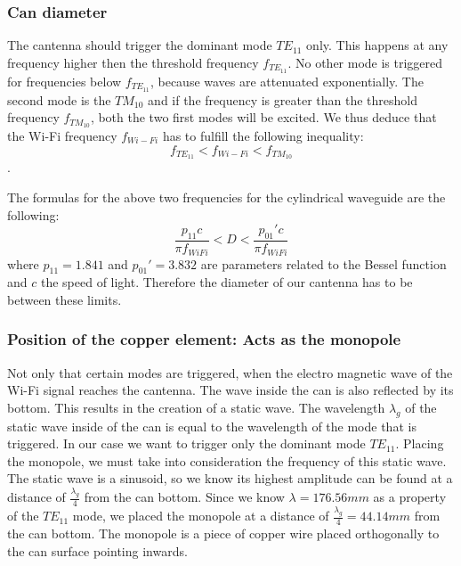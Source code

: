 \documentclass[12pt,a4paper]{article}
\begin{document}
		\subsubsection{Can diameter}
			The cantenna should trigger the dominant mode $TE_{11}$ only. This happens at any frequency higher then the threshold frequency $f_{TE_{11}}$. No other mode is triggered for frequencies below $f_{TE_{11}}$, because waves are attenuated exponentially.
			The second mode is the $TM_{10}$ and if the frequency is greater than the threshold frequency $f_{TM_{10}}$, both the two first modes will be excited.
			We thus deduce that the Wi-Fi frequency $f_{Wi-Fi}$ has to fulfill the following inequality:
			\begin{equation}
				f_{TE_{11}} < f_{Wi-Fi} < f_{TM_{10}}
			\end{equation}.
			
			The formulas for the above two frequencies for the cylindrical waveguide are the following\cite{waveguide}:
			\begin{equation}
				\frac{p_{11} c}{\pi f_{WiFi}} < D < \frac{p_{01}' c}{\pi f_{WiFi}}
			\end{equation}
			where $p_{11} = 1.841$ and $p_{01}'= 3.832$ are parameters related to the Bessel function and $c$ the speed of light.
			Therefore the diameter of our cantenna has to be between these limits. 
			
		\subsubsection{Position of the copper element: Acts as the monopole} \label{mono:pos}
			Not only that certain modes are triggered, when the electro magnetic wave of the Wi-Fi signal reaches the cantenna. The wave inside the can is also reflected by its bottom. This results in the creation of a static wave.
			The wavelength $\lambda_g$ of the static wave inside of the can is equal to the wavelength of the mode that is triggered. In our case we want to trigger only the dominant mode $TE_{11}$.
			Placing the monopole, we must take into consideration the frequency of this static wave.
			The static wave is a sinusoid, so we know its highest amplitude can be found at a distance of $\frac{\lambda_g}{4}$ from the can bottom.
			Since we know $\lambda = 176.56 mm$ as a property of the $TE_{11}$ mode, we placed the monopole at a distance of $\frac{\lambda_g}{4} = 44.14 mm$ from the can bottom. The monopole is a piece of copper wire placed orthogonally to the can surface pointing inwards.
		
\end{document}
